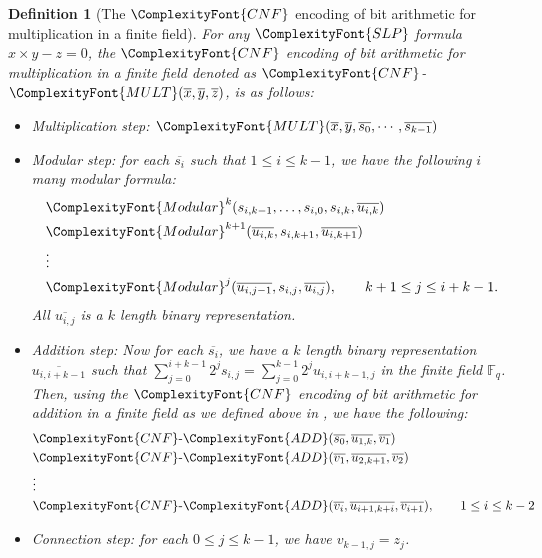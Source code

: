 \documentclass[11pt,letter]{article}
\newtheorem{definition}[theorem]{Definition}
\theoremstyle{remark} %
\newcommand{\CNF}{ %
    {
        \ComplexityFont{CNF}
    }
}
\newcommand{\add}{ %
    {
        \ComplexityFont{ADD}
    }
}
\newcommand{\modular}{ %
    {
        \ComplexityFont{Modular}
    }
}
\newcommand{\mult}{ %
    {
        \ComplexityFont{MULT}
    }
}
\newcommand{\SLP}{ %
    {
        \ComplexityFont{SLP}
    }
}
\begin{document}
{    \begin{definition}[The $\CNF$ encoding of bit arithmetic for multiplication in a finite field]
         \label{def: cnf multiplication}
        For any $\SLP$ formula $x\times y-z=0$, the $\CNF$ encoding of bit arithmetic for multiplication in a finite field denoted as $\CNF$-$\mult(\overline{x},\overline{y},\overline{z})$, is as follows:
        \begin{itemize}
            \item Multiplication step: $\mult(\overline{x},\overline{y},\overline{s_0},\cdots, \overline{s_{k-1}})$
            \item Modular step: for each $\overline{s_i}$ such that $1 \leq i \leq k-1$, we have the following $i$ many modular formula:
            \begin{align*}
                &\modular^k(s_{i,k-1},\dots,s_{i,0},s_{i,k}, \overline{u_{i,k}}) \\
                &\modular^{k+1}(\overline{u_{i,k}}, s_{i,k+1}, \overline{u_{i,k+1}}) \\
                &\vdots\\
                &\modular^j(\overline{u_{i,j-1}}, s_{i,j}, \overline{u_{i,j}}), \qquad k+1 \leq j \leq i+k-1.
            \end{align*}
            All $\overline{u_{i,j}}$ is a $k$ length binary representation.
            \item Addition step: Now for each $\overline{s_i}$, we have a $k$ length binary representation $\overline{u_{i,i+k-1}}$ such that $\sum_{j=0}^{i+k-1}2^j s_{i,j}=\sum_{j=0}^{k-1} 2^j u_{i,i+k-1,j}$ in the finite field $\mathbb{F}_q$. Then, using the $\CNF$ encoding of bit arithmetic for addition in a finite field as we defined above in , we have the following:
            \begin{align*}
                &\CNF\text{-}\add(\overline{s_0},\overline{u_{1,k}},\overline{v_1})\\
                &\CNF\text{-}\add(\overline{v_1},\overline{u_{2,k+1}},\overline{v_2})\\
                &\vdots\\
                &\CNF\text{-}\add(\overline{v_i},\overline{u_{i+1,k+i}},\overline{v_{i+1}}),\qquad 1 \leq i \leq k-2
            \end{align*}
            \item Connection step: for each $0 \leq j \leq k-1$, we have $v_{k-1,j} = z_j$.
        \end{itemize}

\end{definition}}
\end{document}
